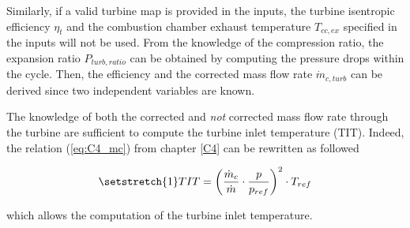 Similarly, if a valid turbine map is provided in the inputs, the turbine isentropic efficiency $\eta_{t}$ and the combustion chamber exhaust temperature $T_{cc,ex}$ specified in the inputs will not be used. From the knowledge of the compression ratio, the expansion ratio $P_{turb,ratio}$ can be obtained by computing the pressure drops within the cycle. Then, the efficiency and the corrected mass flow rate $\dot{m}_{c,turb}$ can be derived since two independent variables are known.

The knowledge of both the corrected and \textit{not} corrected mass flow rate through the turbine are sufficient to compute the turbine inlet temperature (TIT). Indeed, the relation (\ref{eq:C4_mc}) from chapter \ref{C4} can be rewritten as followed

\begin{equation}
    \setstretch{1}
TIT =\left(\frac{\dot{m}_c}{\dot{m}}\cdot\frac{p}{p_{ref}}\right)^2\cdot T_{ref}
\end{equation} 

which allows the computation of the turbine inlet temperature.
\newpage
